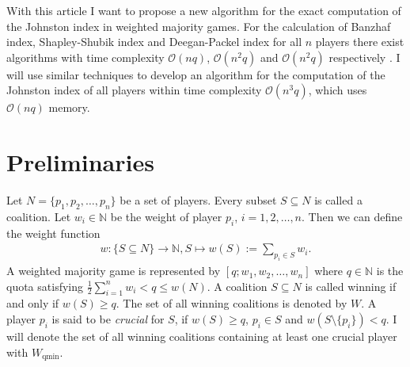 \documentclass[review]{elsarticle}
\theoremstyle{defn}
\theoremstyle{Pseudo-Code}
\begin{document}
% 
With this article I want to propose a new algorithm for the exact computation of the Johnston index in weighted majority games.
For the calculation of Banzhaf index, Shapley-Shubik index and Deegan-Packel index for all $n$ players there exist algorithms with time complexity $\mathcal{O}(nq)$, $\mathcal{O}(n^2q)$ and $\mathcal{O}(n^2q)$ respectively \citep{Uno2003}.
I will use similar techniques to develop an algorithm for the computation of the Johnston index of all players within time complexity $\mathcal{O}(n^3q)$, which uses $\mathcal{O}(nq)$ memory.


\section{Preliminaries}
Let $N=\{p_1,p_2,\dots,p_n\}$ be a set of players. Every subset $S\subseteq N$ is called a coalition.
Let $w_i\in\mathbb{N}$ be the weight of player $p_i$, $i=1,2,\dots,n$. Then we can define the weight function 
\begin{align*}
  w:\{S\subseteq N\}\rightarrow\mathbb{N}, 
  S\mapsto w(S):=\sum_{p_i\in S} w_i.
\end{align*}
A weighted majority game is represented by $[q;w_1,w_2,\dots,w_n]$ where $q\in\mathbb{N}$ is the quota satisfying $\frac{1}{2}\sum_{i=1}^n w_i<q\leq w(N)$. A coalition $S\subseteq N$ is called winning if and only if $w(S)\geq q$.
The set of all winning coalitions is denoted by $W$.
A player $p_i$ is said to be \emph{crucial} for $S$, if $w(S)\geq q$, $p_i\in S$ and $w(S\setminus \{p_i\})<q$. I will denote the set of all winning coalitions containing at least one crucial player with $W_\text{qmin}$.
\end{document}
